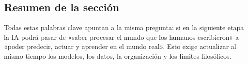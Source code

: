 \subsection{Resumen de la sección}

Todas estas palabras clave apuntan a la misma pregunta: si en la siguiente etapa la IA podrá pasar de «saber procesar el mundo que los humanos escribieron» a «poder predecir, actuar y aprender en el mundo real». Esto exige actualizar al mismo tiempo los modelos, los datos, la organización y los límites filosóficos.

